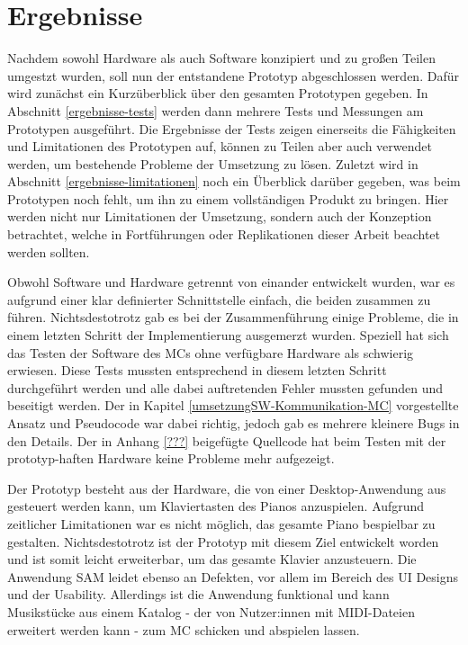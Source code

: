 

\chapter{Ergebnisse} \label{ergebnisse}
\nocite{*}

Nachdem sowohl Hardware als auch Software konzipiert und zu großen Teilen umgestzt wurden, soll nun der entstandene Prototyp abgeschlossen werden.
Dafür wird zunächst ein Kurzüberblick über den gesamten Prototypen gegeben.
In Abschnitt \ref{ergebnisse-tests} werden dann mehrere Tests und Messungen am Prototypen ausgeführt.
Die Ergebnisse der Tests zeigen einerseits die Fähigkeiten und Limitationen des Prototypen auf, können zu Teilen aber auch verwendet werden, um bestehende Probleme der Umsetzung zu lösen.
Zuletzt wird in Abschnitt \ref{ergebnisse-limitationen} noch ein Überblick darüber gegeben, was beim Prototypen noch fehlt, um ihn zu einem vollständigen Produkt zu bringen. %
Hier werden nicht nur Limitationen der Umsetzung, sondern auch der Konzeption betrachtet, welche in Fortführungen oder Replikationen dieser Arbeit beachtet werden sollten.


Obwohl Software und Hardware getrennt von einander entwickelt wurden, war es aufgrund einer klar definierter Schnittstelle einfach, die beiden zusammen zu führen.
Nichtsdestotrotz gab es bei der Zusammenführung einige Probleme, die in einem letzten Schritt der Implementierung ausgemerzt wurden.
Speziell hat sich das Testen der Software des \ac{MC}s ohne verfügbare Hardware als schwierig erwiesen.
Diese Tests mussten entsprechend in diesem letzten Schritt durchgeführt werden und alle dabei auftretenden Fehler mussten gefunden und beseitigt werden.
Der in Kapitel \ref{umsetzungSW-Kommunikation-MC} vorgestellte Ansatz und Pseudocode war dabei richtig, jedoch gab es mehrere kleinere Bugs in den Details.
Der in Anhang \ref{???} beigefügte Quellcode hat beim Testen mit der prototyp-haften Hardware keine Probleme mehr aufgezeigt.

Der Prototyp besteht aus der Hardware, die von einer Desktop-Anwendung aus gesteuert werden kann, um Klaviertasten des Pianos anzuspielen.
Aufgrund zeitlicher Limitationen war es nicht möglich, das gesamte Piano bespielbar zu gestalten.
Nichtsdestotrotz ist der Prototyp mit diesem Ziel entwickelt worden und ist somit leicht erweiterbar, um das gesamte Klavier anzusteuern.
Die Anwendung \ac{SAM} leidet ebenso an Defekten, vor allem im Bereich des \ac{UI} Designs und der Usability.
Allerdings ist die Anwendung funktional und kann Musikstücke aus einem Katalog - der von Nutzer:innen mit \ac{MIDI}-Dateien erweitert werden kann - zum \ac{MC} schicken und abspielen lassen.




